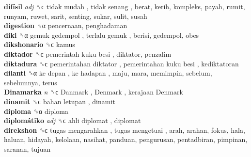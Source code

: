 \textbf{difísil} \emph{adj}  ␝ϲ   tidak mudah ,  tidak senang , berat, kerih, kompleks, payah, rumit, runyam, ruwet, sarit, senting, sukar, sulit, susah  \\
\textbf{digestion} ␝α  pencernaan, penghadaman  \\
\textbf{diki} ␝α   gemuk gedempol ,  terlalu gemuk , berisi, gedempol, obes  \\
\textbf{dikshonario} ␝ϲ  kamus  \\
\textbf{diktador} ␝ϲ   pemerintah kuku besi , diktator, penzalim  \\
\textbf{diktadura} ␝ϲ   pemerintahan diktator ,  pemerintahan kuku besi , kediktatoran  \\
\textbf{dilanti} ␝α   ke depan ,  ke hadapan , maju, mara, memimpin, sebelum, sebelumnya, terus  \\
\textbf{Dinamarka} \emph{n}  ␝ϲ   Danmark ,  Denmark ,  kerajaan Denmark   \\
\textbf{dinamit} ␝ϲ   bahan letupan , dinamit  \\
\textbf{diploma} ␝α  diploma  \\
\textbf{diplomátiko} \emph{adj}  ␝ϲ   ahli diplomat , diplomat  \\
\textbf{direkshon} ␝ϲ   tugas mengarahkan ,  tugas mengetuai , arah, arahan, fokus, hala, haluan, hidayah, kelolaan, nasihat, panduan, pengurusan, pentadbiran, pimpinan, saranan, tujuan  \\
